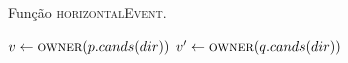 \begin{algorithm}[H]
    \caption{Função \textsc{horizontalEvent}.}
    \label{alg:par-cinetico:eventohorizontal}
    \begin{algorithmic}[1]
                \State {}
            \Else
                    \State {}
                \EndIf
            \EndIf
            \State $v \leftarrow \Call{owner}{p.cands(dir)}$
            \State $v' \leftarrow \Call{owner}{q.cands(dir)}$
                \State {}
            \EndIf
        \EndFunction
    \end{algorithmic}
\end{algorithm}